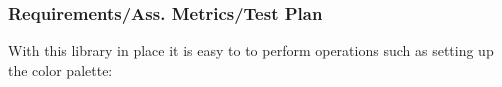 \documentclass[xcolor=table]{beamer}
\begin{document}
\begin{frame}
    \frametitle{Requirements/Ass. Metrics/Test Plan}
    With this library in place it is easy to to perform operations such as setting
    up the color palette:
\end{frame}

%
%
%
\end{document}
